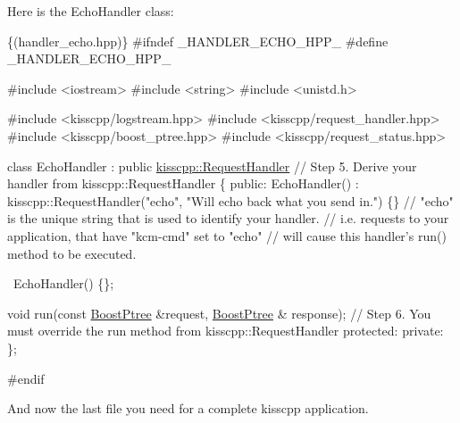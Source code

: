 Here is the Echo\-Handler class\-: 
\begin{DoxyCode}
\{(handler\_echo.hpp)\}
#ifndef \_HANDLER\_ECHO\_HPP\_
#define \_HANDLER\_ECHO\_HPP\_

#include <iostream>
#include <string>
#include <unistd.h>

#include <kisscpp/logstream.hpp>
#include <kisscpp/request\_handler.hpp>
#include <kisscpp/boost\_ptree.hpp>
#include <kisscpp/request\_status.hpp>

\textcolor{keyword}{class} EchoHandler : \textcolor{keyword}{public} \hyperlink{classkisscpp_1_1_request_handler}{kisscpp::RequestHandler}      
                           \textcolor{comment}{// Step 5. Derive your handler from kisscpp::RequestHandler}
\{
  \textcolor{keyword}{public}:
    EchoHandler() :
      kisscpp::RequestHandler(\textcolor{stringliteral}{"echo"}, \textcolor{stringliteral}{"Will echo back what you send in."}) \{\} \textcolor{comment}{//
       "echo" is the unique string that is used to identify your handler.}
                                                                             \textcolor{comment}{//
       i.e. requests to your application, that have "kcm-cmd" set to "echo"}
                                                                             \textcolor{comment}{//
       will cause this handler's run() method to be executed.}

    ~EchoHandler() \{\};

    \textcolor{keywordtype}{void} run(\textcolor{keyword}{const} \hyperlink{boost__ptree_8hpp_ab36820650b8e0db36402aea80485633c}{BoostPtree} &request, \hyperlink{boost__ptree_8hpp_ab36820650b8e0db36402aea80485633c}{BoostPtree} &
      response);               \textcolor{comment}{// Step 6. You must override the run method from
       kisscpp::RequestHandler}
  \textcolor{keyword}{protected}:
  \textcolor{keyword}{private}:
\};

\textcolor{preprocessor}{#endif}
\end{DoxyCode}


And now the last file you need for a complete kisscpp application.


